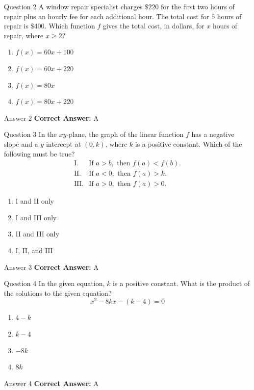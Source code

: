 \documentclass{beamer}
\begin{document}
\begin{frame}{Question 2}
\small
A window repair specialist charges \(\$220\) for the first two hours of repair
plus an hourly fee for each additional hour. The total cost for \(5\) hours of
repair is \(\$400\). Which function \(f\) gives the total cost, in dollars, for
\(x\) hours of repair, where \(x\ge 2\)?
\vspace{0.35cm}
\begin{enumerate}
    \item[A.] \(f(x)=60x+100\)
    \item[B.] \(f(x)=60x+220\)
    \item[C.] \(f(x)=80x\)
    \item[D.] \(f(x)=80x+220\)
\end{enumerate}
\end{frame}
\begin{frame}{Answer 2}
\small
\textbf{Correct Answer:} A
\end{frame}

\begin{frame}{Question 3}
\small
In the \(xy\)-plane, the graph of the linear function \(f\) has a negative slope
and a \(y\)-intercept at \((0,k)\), where \(k\) is a positive constant. Which of
the following must be true?
\[
\begin{array}{ll}
\text{I.} & \text{If }a>b,\text{ then }f(a)<f(b).\\
\text{II.} & \text{If }a<0,\text{ then }f(a)>k.\\
\text{III.} & \text{If }a>0,\text{ then }f(a)>0.
\end{array}
\]
\vspace{0.35cm}
\begin{enumerate}
    \item[A.] I and II only
    \item[B.] I and III only
    \item[C.] II and III only
    \item[D.] I, II, and III
\end{enumerate}
\end{frame}
\begin{frame}{Answer 3}
\small
\textbf{Correct Answer:} A
\end{frame}

\begin{frame}{Question 4}
\small
In the given equation, \(k\) is a positive constant. What is the product of the
solutions to the given equation?
\[
x^2-8kx-(k-4)=0
\]
\vspace{0.35cm}
\begin{enumerate}
    \item[A.] \(4-k\)
    \item[B.] \(k-4\)
    \item[C.] \(-8k\)
    \item[D.] \(8k\)
\end{enumerate}
\end{frame}
\begin{frame}{Answer 4}
\small
\textbf{Correct Answer:} A
\end{frame}
\end{document}
